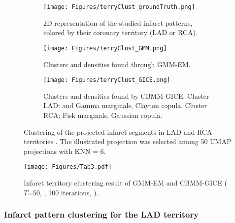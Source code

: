 \begin{figure}[tb]
\centering
\begin{subfigure}[t]{0.32\textwidth}
  \centering
  \texttt{[image: Figures/terryClust\_groundTruth.png]}
  \captionsetup{width=.9\linewidth}
  \caption{2D representation of the studied infarct patterns, colored by their coronary territory (LAD or RCA).}
  \label{fig:terryClust_Projected infarct segmentations}
\end{subfigure}%
\begin{subfigure}[t]{0.32\textwidth}
  \centering
  \texttt{[image: Figures/terryClust\_GMM.png]}
  \captionsetup{width=.95\linewidth}
  \caption{Clusters and densities found through GMM-EM. }
  \label{fig:terryClust_result GMM-EM}
\end{subfigure}
\begin{subfigure}[t]{0.32\textwidth}
  \centering
  \texttt{[image: Figures/terryClust\_GICE.png]}
  \captionsetup{width=.95\linewidth}
  \caption{Clusters and densities found by CBMM-GICE. Cluster LAD:  and Gamma marginals, Clayton copula. Cluster RCA: Fisk marginals, Gaussian copula.}
  \label{fig:terryClust_result CBMM-GICE}
\end{subfigure} 
\caption{Clustering of the projected infarct segments in LAD and RCA territories . 
The illustrated projection was selected  among 50 UMAP projections with KNN = 6.
}
\label{fig:terryClust_figures}
\end{figure}

\begin{figure}
    \centering
    \texttt{[image: Figures/Tab3.pdf]}
    \caption{Infarct territory clustering result of GMM-EM and CBMM-GICE ( $T$=50, , 100  iterations, ). }
    \label{fig:terryClust_table}
\end{figure}

\subsubsection{Infarct pattern clustering for the LAD territory}
\label{subsubsec:Infarct pattern clustering in LAD territory}

